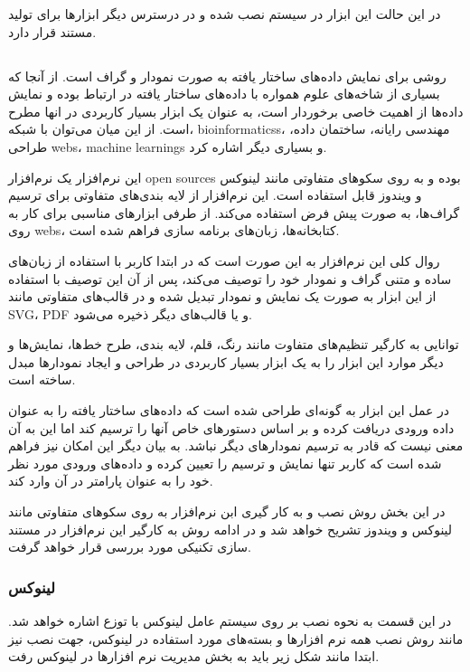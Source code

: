 در این حالت این ابزار در سیستم نصب شده و در درسترس دیگر ابزارها برای تولید مستند
قرار دارد.

\subsection{}

 روشی برای نمایش داده‌های ساختار یافته به صورت نمودار و گراف است.
از آنجا که بسیاری از شاخه‌های علوم همواره با داده‌های ساختار یافته در ارتباط
بوده و نمایش داده‌ها از اهمیت خاصی برخوردار است،  به عنوان یک ابزار
بسیار کاربردی در انها مطرح است. از این میان می‌توان با شبکه،
\glspl{bioinformatics}، مهندسی رایانه، ساختمان داده، طراحی \glspl{web}،
\glspl{machine learning} و بسیاری دیگر اشاره کرد.

این نرم‌افزار یک نرم‌افزار \glspl{open source} بوده و به روی سکوهای متفاوتی
مانند لینوکس و ویندوز قابل استفاده است. این نرم‌افزار از لایه بندی‌های متفاوتی
برای ترسیم گراف‌ها، به صورت پیش فرض استفاده می‌کند. از طرفی ابزارهای مناسبی برای
کار به روی \glspl{web}، کتابخانه‌ها، زبان‌های برنامه سازی فراهم شده است.

روال کلی این نرم‌افزار به این صورت است که در ابتدا کاربر با استفاده از زبان‌های
ساده و متنی گراف و نمودار خود را توصیف می‌کند، پس از آن این توصیف با استفاده از
این ابزار به صورت یک نمایش و نمودار تبدیل شده و در قالب‌های متفاوتی مانند
\gls{SVG}، \gls{PDF} و یا قالب‌های دیگر ذخیره می‌شود.

توانایی به کارگیر تنظیم‌های متفاوت مانند رنگ، قلم، لایه بندی، طرح خط‌ها،
نمایش‌ها و دیگر موارد این ابزار را به یک ابزار بسیار کاربردی در طراحی و ایجاد
نمودارها مبدل ساخته است.

در عمل این ابزار به گونه‌ای طراحی شده است که داده‌های ساختار یافته را به عنوان
داده ورودی دریافت کرده و بر اساس دستورهای خاص آنها را ترسیم کند اما این به آن
معنی نیست که قادر به ترسیم نمودارهای دیگر نباشد. به بیان دیگر این امکان نیز
فراهم شده است که کاربر تنها نمایش و ترسیم را تعیین کرده و داده‌های ورودی مورد
نظر خود را به عنوان پارامتر در آن وارد کند.

در این بخش روش نصب و به کار گیری ابن نرم‌افزار به روی سکوهای متفاوتی مانند
لینوکس و ویندوز تشریح خواهد شد و در ادامه روش به کارگیر این نرم‌افزار در مستند
سازی تکنیکی مورد بررسی قرار خواهد گرفت.

\subsubsection{لینوکس}
در این قسمت به نحوه نصب  بر روی سیستم عامل لینوکس با توزع  اشاره خواهد شد.
مانند روش نصب همه نرم افزارها و بسته‌های مورد استفاده در لینوکس، جهت نصب  نیز ابتدا مانند شکل زیر باید به بخش مدیریت نرم افزارها در لینوکس رفت.

